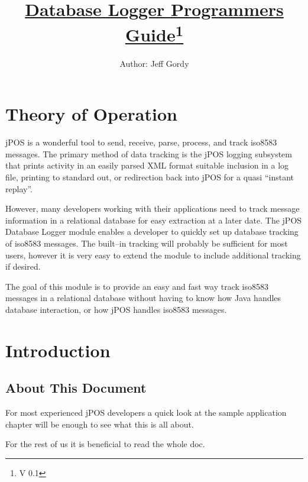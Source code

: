 \documentclass[11pt]{report}
\begin{document}
\title{\textbf{\underline{Database Logger Programmers Guide\thanks{V 0.1}}}}
\author{Author: Jeff Gordy\\ }
\date{}
\maketitle

\tableofcontents
\listoftables


\begin{flushleft}

\chapter{Theory of Operation}
    jPOS is a wonderful tool to send, receive, parse, process, and track iso8583
    messages.  The primary method of data tracking is the jPOS logging
    subsystem that prints activity in an easily parsed XML format suitable
    inclusion in a log file, printing to standard out, or redirection back
    into jPOS for a quasi ``instant replay''.
    
    However, many developers working with their applications need
    to track message information in a relational database for easy extraction
    at a later date.  The jPOS Database Logger module enables a developer to
    quickly set up database tracking of iso8583 messages.  The built--in
    tracking will probably be sufficient for most users, however it is very
    easy to extend the module to include additional tracking if desired.

    The goal of this module is to provide an easy and fast way track iso8583 
    messages in a relational database without having to know how Java handles
    database interaction, or how jPOS handles iso8583 messages.

\chapter{Introduction}
    \section{About This Document}
        For most experienced jPOS developers a quick look at the sample
        application chapter will be enough to see what this is all about.  

        For the rest of us it is beneficial to read the whole doc.


\end{flushleft}
\end{document}
